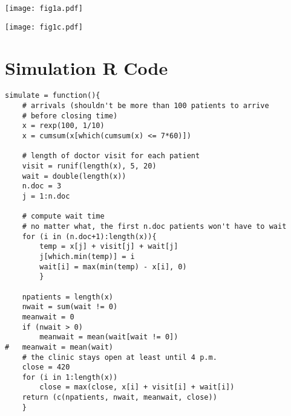 \documentclass[12pt]{article}
\begin{document}

\begin{center}

\texttt{[image: fig1a.pdf]}

\bigskip

\texttt{[image: fig1c.pdf]}

\end{center}

\newpage
\section*{Simulation R Code}
\begin{verbatim}
simulate = function(){
    # arrivals (shouldn't be more than 100 patients to arrive
    # before closing time)
    x = rexp(100, 1/10)
    x = cumsum(x[which(cumsum(x) <= 7*60)])

    # length of doctor visit for each patient
    visit = runif(length(x), 5, 20)
    wait = double(length(x))
    n.doc = 3
    j = 1:n.doc

    # compute wait time
    # no matter what, the first n.doc patients won't have to wait
    for (i in (n.doc+1):length(x)){
        temp = x[j] + visit[j] + wait[j]
        j[which.min(temp)] = i
        wait[i] = max(min(temp) - x[i], 0)
        }

    npatients = length(x)
    nwait = sum(wait != 0)
    meanwait = 0
    if (nwait > 0)
        meanwait = mean(wait[wait != 0])
#   meanwait = mean(wait)
    # the clinic stays open at least until 4 p.m.
    close = 420
    for (i in 1:length(x))
        close = max(close, x[i] + visit[i] + wait[i])
    return (c(npatients, nwait, meanwait, close))
    }
\end{verbatim}
\end{document}
